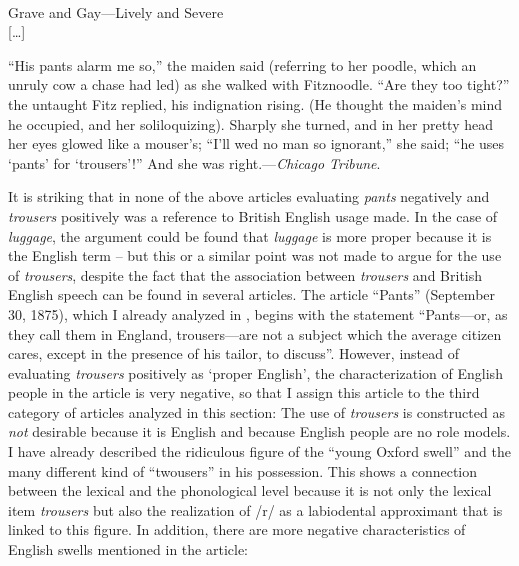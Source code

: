 \begin{ipquote}
\begin{center}
\\
Grave and Gay—Lively and Severe\\
{[…]}    
\end{center}
“His pants alarm me so,” the maiden said (referring to her poodle, which an unruly cow a chase had led) as she walked with Fitznoodle. “Are they too tight?” the untaught Fitz replied, his indignation rising. (He thought the maiden’s mind he occupied, and her soliloquizing). Sharply she turned, and in her pretty head her eyes glowed like a mouser’s; “I’ll wed no man so ignorant,” she said; “he uses ‘pants’ for ‘trousers’!” And she was right.—\textit{Chicago Tribune}.
\end{ipquote}

It is striking that in none of the above articles evaluating \emph{pants} negatively and \emph{trousers} positively was a reference to British English usage made. In the case of \emph{luggage}, the argument could be found that \emph{luggage} is more proper because it is the English term – but this or a similar point was not made to argue for the use of \emph{trousers}, despite the fact that the association between \emph{trousers} and British English speech can be found in several articles. The article “Pants” (September 30, 1875), which I already analyzed in , begins with the statement “Pants—or, as they call them in England, trousers—are not a subject which the average citizen cares, except in the presence of his tailor, to discuss”. However, instead of evaluating \emph{trousers} positively as ‘proper English’, the characterization of English people in the article is very negative, so that I assign this article to the third category of articles analyzed in this section: The use of \emph{trousers} is constructed as \emph{not} desirable because it is English and because English people are no role models. I have already described the ridiculous figure of the “young Oxford swell” and the many different kind of “twousers” in his possession. This shows a connection between the lexical and the phonological level because it is not only the lexical item \emph{trousers} but also the realization of /r/ as a labiodental approximant that is linked to this figure. In addition, there are more negative characteristics of English swells mentioned in the article:

